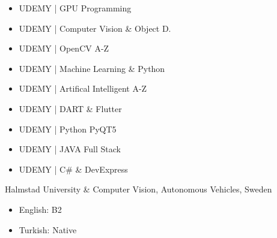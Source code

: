 
\smallskip




\smallskip

\smallskip

\begin{itemize}
    \item UDEMY | GPU Programming 
    \item UDEMY | Computer Vision \& Object D.
    \item UDEMY | OpenCV A-Z
    \item UDEMY | Machine Learning \& Python 
    \item UDEMY | Artifical Intelligent A-Z 
    \item UDEMY | DART \& Flutter 
    \item UDEMY | Python PyQT5 
    \item UDEMY | JAVA Full Stack 
    \item UDEMY | C\# \& DevExpress 
\end{itemize}


{Halmstad University \& Computer Vision, Autonomous Vehicles, Sweden}

\smallskip

\begin{itemize}
    \item English: B2
    \item Turkish: Native
\end{itemize}

\smallskip
